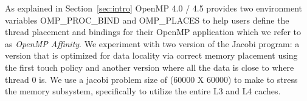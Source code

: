 As explained in Section~\ref{sec:intro} OpenMP 4.0 / 4.5 provides two environment variables OMP\_PROC\_BIND and OMP\_PLACES to help users define the thread placement and bindings for their OpenMP application which we refer to as \textit{OpenMP Affinity}.%
%
 We experiment with two version of the Jacobi program: a version that is optimized for data locality via correct memory placement using the first touch policy and another version where 
 all the data is close to where thread 0 is.   We use a jacobi problem size of (60000 X 60000)  to make to stress the memory subsystem, specifically to utilize the entire L3 and L4 caches.
 
